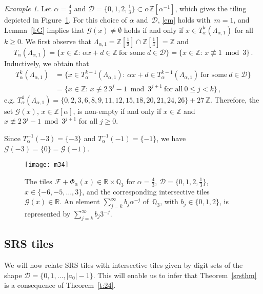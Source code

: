 \documentclass[12pt]{amsart}
\theoremstyle{definition}
\theoremstyle{remark}
\newtheorem{example}[lemma]{Example}
\numberwithin{equation}{section}
\begin{document}
\begin{example}
Let $\alpha = \frac{4}{3}$ and $\mathcal{D} = \{0, 1, 2, \frac{1}{3}\} \subset \alpha \mathbb{Z}[\alpha^{-1}]$, which gives the tiling depicted in Figure~\ref{fig:m34}.
For this choice of $\alpha$ and~$\mathcal{D}$, \eqref{em} holds with~$m = 1$, and Lemma~\ref{l:G} implies that $\mathcal{G}(x) \ne \emptyset$ holds if and only if $x \in T_\alpha^k(\Lambda_{\alpha,1})$ for all $k \ge 0$.
We first observe that $\Lambda_{\alpha,1} = \mathbb{Z}[\tfrac{1}{3}] \cap \mathbb{Z}[\tfrac{1}{4}] = \mathbb{Z}$ and
\[
T_\alpha(\Lambda_{\alpha,1}) = \{x \in \mathbb{Z}:\, \alpha x + d \in \mathbb{Z}\ \mbox{for some}\ d \in \mathcal{D}\} = \{x \in \mathbb{Z}:\, x \not\equiv 1 \bmod 3\}\,.
\]
Inductively, we obtain that
\begin{align*}
T_\alpha^k(\Lambda_{\alpha,1}) & = \{x \in T_\alpha^{k-1}(\Lambda_{\alpha,1}):\, \alpha x + d \in T_\alpha^{k-1}(\Lambda_{\alpha,1})\ \mbox{for some}\ d \in \mathcal{D}\} \\
& = \{x \in \mathbb{Z}:\, x \not\equiv 2\,3^j-1 \bmod 3^{j+1}\ \mbox{for all}\ 0 \le j < k\}\,,
\end{align*}
e.g. $T_\alpha^4(\Lambda_{\alpha,1}) = \{0,2,3,6,8,9,11,12,15,18,20,21,24,26\} + 27\, \mathbb{Z}$.
Therefore, the set $\mathcal{G}(x)$, $x \in \mathbb{Z}[\alpha]$, is non-empty if and only if $x \in \mathbb{Z}$ and $x \not\equiv 2\,3^j-1 \bmod 3^{j+1}$ for all $j \ge 0$.

Since $T_\alpha^{-1}(-3) = \{-3\}$ and $T_\alpha^{-1}(-1) = \{-1\}$, we have $\mathcal{G}(-3) = \{0\} = \mathcal{G}(-1)$.

\begin{figure}[ht]
\texttt{[image: m34]}
\caption{The tiles $\mathcal{F} + \Phi_\alpha(x) \in \mathbb{R} \times \mathbb{Q}_3$ for $\alpha = \frac{4}{3}$, $\mathcal{D} = \{0,1,2,\frac{1}{3}\}$, $x \in \{-6,-5,\ldots,3\}$, and the corresponding intersective tiles~$\mathcal{G}(x) \in \mathbb{R}$.
An element $\sum_{j=k}^\infty b_j \alpha^{-j}$ of~$\mathbb{Q}_3$, with $b_j \in \{0,1,2\}$, is represented by $\sum_{j=k}^\infty b_j 3^{-j}$.} \label{fig:m34}
\end{figure}
\end{example}

\subsection*{SRS tiles}
We will now relate SRS tiles with intersective tiles given by digit sets of the shape $\mathcal{D} = \{0, 1, \ldots, |a_0|-1\}$.
This will enable us to infer that Theorem~\ref{srsthm} is a consequence of Theorem~\ref{t:24}.
\end{document}
